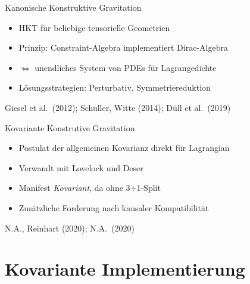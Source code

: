 \documentclass{beamer}
\begin{document}
    \begin{frame}{Kanonische Konstruktive Gravitation}
        \begin{itemize}
            \item HKT für beliebige tensorielle Geometrien
            \item Prinzip: Constraint-Algebra implementiert Dirac-Algebra
            \item $\Leftrightarrow$ unendliches System von PDEs für Lagrangedichte
            \item Lösungsstrategien: Perturbativ, Symmetriereduktion
        \end{itemize}

        \raggedleft\scriptsize \lbrack Giesel et al.\ (2012); Schuller, Witte (2014); Düll et al.\ (2019)\rbrack
    \end{frame}

    \begin{frame}{Kovariante Konstrutive Gravitation}
        \begin{itemize}
            \item Postulat der allgemeinen Kovarianz direkt für Lagrangian
            \item Verwandt mit Lovelock und Deser
            \item Manifest \emph{Kovariant}, da ohne 3+1-Split
            \item Zusätzliche Forderung nach kausaler Kompatibilität
        \end{itemize}

        \raggedleft\scriptsize \lbrack N.A., Reinhart (2020); N.A.\ (2020)\rbrack
    \end{frame}


    \section{Kovariante Implementierung}\label{sec:covariant-constructive-gravity}
\end{document}
